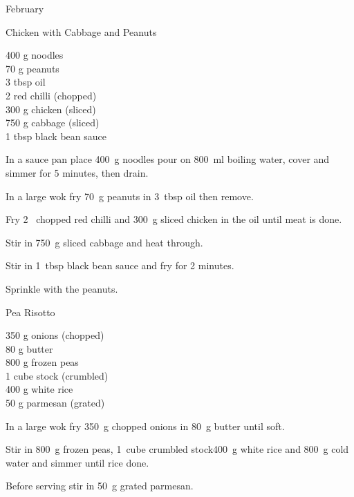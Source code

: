 \begin{menu}{February}
    \begin{recipe}{2}{Chicken with Cabbage and Peanuts}%
		\begin{ingredients}
		400 g noodles  \\
	70 g peanuts  \\
	3 tbsp oil  \\
	2  red chilli (chopped) \\
	300 g chicken (sliced) \\
	750 g cabbage (sliced) \\
	1 tbsp black bean sauce  \\
	
		\end{ingredients}
	
    \begin{instructions}
    \item 
      In a 
      sauce pan
      place
      400~g  noodles
      pour on
      800~ml  boiling water,
      cover and simmer for 5 minutes, then drain.
    \item 
        In a large wok	fry
        70~g  peanuts
        in
        3~tbsp  oil
        then remove.
      \item 
        Fry 2~ chopped red chilli
        and
        300~g sliced chicken
        in the oil until meat is done.
      \item 
        Stir in
        750~g sliced cabbage
        and heat through.
      \item 
        Stir in
        1~tbsp  black bean sauce
        and fry for 2 minutes.
      \item 
        Sprinkle with the peanuts.
      
    \end{instructions}
    \end{recipe}%
  
    \begin{recipe}{2}{Pea Risotto}%
		\begin{ingredients}
		350 g onions (chopped) \\
	80 g butter  \\
	800 g frozen peas  \\
	1 cube stock (crumbled) \\
	400 g white rice  \\
	50 g parmesan (grated) \\
	
		\end{ingredients}
	
    \begin{instructions}
    \item 
        In a large wok fry
        350~g chopped onions
        in
        80~g  butter
        until soft.
      \item 
        Stir in
        800~g  frozen peas,
        1~cube crumbled stock400~g  white rice
        and
        800~g  cold water
        and simmer until rice done.
      \item 
        Before serving stir in
        50~g grated parmesan.
      

\end{instructions}
\end{recipe}
\end{menu}
